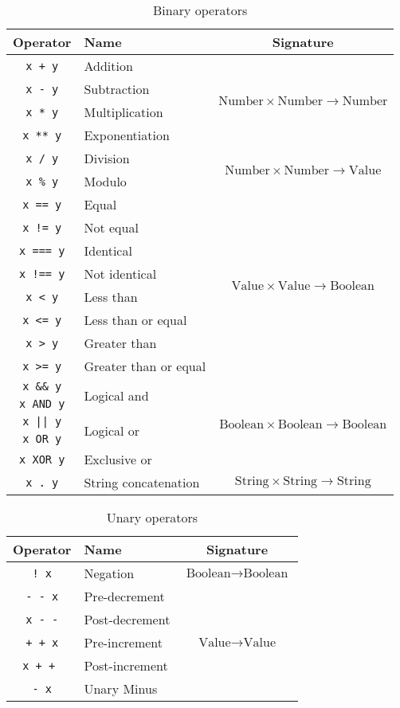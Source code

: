 \begin{table}
\centering
\begin{tabular}{c|l |c}\hline
Operator & Name & Signature\\
\hline\hline

\texttt{x + y} & Addition & \multirow{4}{*}{$ \text{Number} \times \text{Number} \rightarrow \text{Number}$} \\
\texttt{x - y} & Subtraction & \\
\texttt{x * y} & Multiplication & \\
\texttt{x ** y} & Exponentiation & \\\hline
\texttt{x / y} & Division &  \multirow{2}{*}{$ \text{Number} \times \text{Number} \rightarrow \text{Value}$}\\
\texttt{x \% y} & Modulo & \\\hline
\texttt{x == y} & Equal & \multirow{8}{*}{$ \text{Value} \times \text{Value} \rightarrow \text{Boolean}$} \\
\texttt{x != y} & Not equal & \\
\texttt{x === y} & Identical & \\
\texttt{x !== y} & Not identical & \\
\texttt{x < y} & Less than &\\
\texttt{x <= y} & Less than or equal & \\
\texttt{x > y} & Greater than & \\
\texttt{x >= y} & Greater than or equal &\\\hline
\texttt{x \&\& y} & \multirow{2}{*}{Logical and } & \multirow{5}{*}{ $ \text{Boolean} \times \text{Boolean} \rightarrow \text{Boolean}$} \\
\texttt{x AND y} & \\
\texttt{x || y} &  \multirow{2}{*}{Logical or } & \\
\texttt{x OR y} & \\
\texttt{x XOR y} & Exclusive or & \\\hline
\texttt{x . y} & String concatenation & $ \text{String} \times \text{String} \rightarrow \text{String}$ \\\hline
\end{tabular}
\caption{Binary operators\label{tab:binop}}
\end{table}

\begin{table}
\centering
\begin{tabular}{c|l |c}\hline
Operator & Name & Signature\\
\hline\hline
\texttt{! x} & Negation & $\text{Boolean} \rightarrow \text{Boolean}$\\\hline
\texttt{- - x} & Pre-decrement & \multirow{5}{*}{ $\text{Value} \rightarrow \text{Value}$}\\
\texttt{x - -} & Post-decrement & \\
\texttt{+ + x} & Pre-increment &\\
\texttt{x + + } & Post-increment & \\
\texttt{- x} & Unary Minus & \\\hline
\end{tabular}
\caption{Unary operators\label{tab:unop}}
\end{table}

